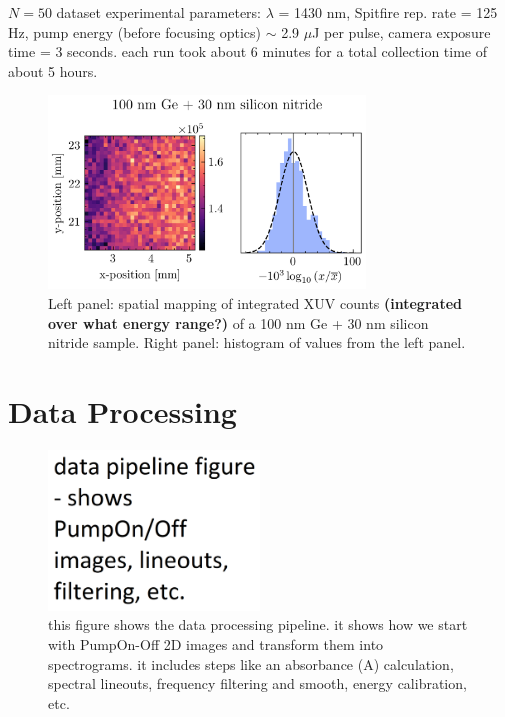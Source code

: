 $N=50$ dataset experimental parameters: $\lambda$ = 1430 nm, Spitfire rep. rate = 125 Hz, pump energy (before focusing optics) $\sim$ 2.9 $\mu$J per pulse, camera exposure time = 3 seconds. each run took about 6 minutes for a total collection time of about 5 hours. 

\begin{figure}
	\centering
	\includegraphics[width=0.75\textwidth]{figures/chap3/Ge_map.png}
	\caption{Left panel: spatial mapping of integrated XUV counts \textbf{(integrated over what energy range?)} of a 100 nm Ge + 30 nm silicon nitride sample. Right panel: histogram of values from the left panel.}
	\label{fig:Ge_map}
\end{figure}

\section{Data Processing}

\begin{figure}
	\centering
	\includegraphics[width=0.5\textwidth]{figures/chap3/Data_Pipeline.png}
	\caption{this figure shows the data processing pipeline. it shows how we start with PumpOn-Off 2D images and transform them into spectrograms. it includes steps like an absorbance (A) calculation, spectral lineouts, frequency filtering and smooth, energy calibration, etc.}
	\label{fig:Data_Pipeline}
\end{figure}

